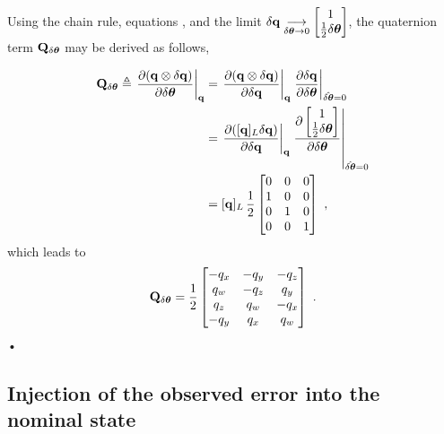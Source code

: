 Using the chain rule, equations , and the  limit $\delta{\bf q} \underset{\delta{\bm \theta}\to 0}{\longrightarrow} \begin{bmatrix}
1 \\ \frac12\delta{\bm \theta}
\end{bmatrix}$, the quaternion term ${\bf Q}_{\delta{\bm \theta}}$ may be derived as follows,
%
{
\setlength{\arraycolsep}{2pt}
\begin{align*}
{\bf Q}_{\delta{\bm \theta}} \triangleq \left.\frac{\partial({\bf q}\otimes\delta{\bf q})}{\partial\delta{\bm \theta}}\right|_{{\bf q}} 
&=\left.\frac{\partial({\bf q}\otimes\delta{\bf q})}{\partial\delta{\bf q}}\right|_{{\bf q}} \left.\frac{\partial\delta{\bf q}}{\partial\delta{\bm \theta}}\right|_{\hat{\delta{\bm \theta}}=0} \\
&= \left.\frac{\partial([{\bf q}]_L\delta{\bf q})}{\partial\delta{\bf q}}\right|_{{\bf q}} \left.\frac{\partial\begin{bmatrix}
1 \\ \frac12\delta{\bm \theta}
\end{bmatrix}}{\partial\delta{\bm \theta}}\right|_{\hat{\delta{\bm \theta}}=0} \\
&= [{\bf q}]_L\,\frac12\begin{bmatrix}
0 & 0 & 0 \\
1 & 0 & 0 \\
0 & 1 & 0 \\
0 & 0 & 1 \\
\end{bmatrix} ~,
\end{align*}
%
which leads to
%
\begin{equation}
{\bf Q}_{\delta{\bm \theta}}
= \frac{1}{2}\begin{bmatrix}
-q_x &-q_y &-q_z\\
 q_w &-q_z & q_y\\
 q_z & q_w &-q_x\\
-q_y & q_x & q_w\\
\end{bmatrix}~.
\end{equation}•

\subsection{Injection of the observed error into the nominal state}

}
